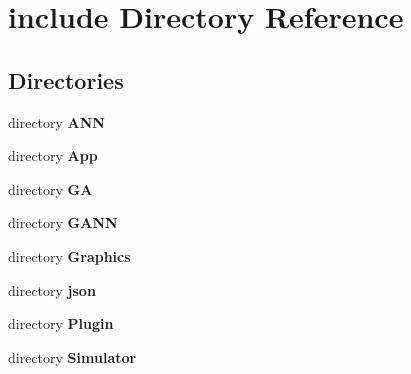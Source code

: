 \section{include Directory Reference}
\label{dir_d44c64559bbebec7f509842c48db8b23}
\subsection*{Directories}
\begin{DoxyCompactItemize}
\item 
directory {\bf A\+N\+N}
\item 
directory {\bf App}
\item 
directory {\bf G\+A}
\item 
directory {\bf G\+A\+N\+N}
\item 
directory {\bf Graphics}
\item 
directory {\bf json}
\item 
directory {\bf Plugin}
\item 
directory {\bf Simulator}
\end{DoxyCompactItemize}

